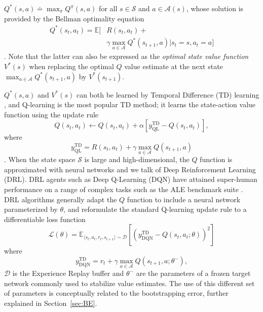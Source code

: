 $Q^*\left(s,a\right)\doteq\max_{\pi}Q^{\pi}\left(s,a\right)$ for all
$s\in\mathcal{S}$ and $a\in\mathcal{A}\left(s\right)$, whose solution
is provided by the Bellman optimality equation
\begin{equation}
\begin{aligned}
Q^*\left(s_t,a_t\right)=\mathbb{E}\bigg[&R\left(s_t,a_t\right)+\\ &\gamma
  \max_{a\in\mathcal{A}}Q^*\left(s_{t+1},a\right)\bigg\vert
  s_t=s,a_t=a \bigg]
\end{aligned}
\end{equation}
\citep{bellman1957dynamic}. Note that the latter can
also be expressed as the \textit{optimal state value function}
$V^*\left(s\right)$ when replacing the optimal $Q$ value estimate at
the next state
$\max_{a\in\mathcal{A}}Q^*\left(s_{t+1},a\right)$ by
$V^*\left(s_{t+1}\right)$.

$Q^*\left(s,a\right)$ and $V^*\left(s\right)$ can both be learned by
Temporal Difference (TD) learning
\citep{sutton1988learning}, and Q-learning is the most popular TD
method; it learns the state-action value function using the update
rule
\begin{equation}
Q\left(s_t,a_t\right)\leftarrow
Q\left(s_t,a_t\right)+\alpha\left[y^{\scriptscriptstyle
\textrm{TD}}_{\scriptscriptstyle \textrm{QL}}-Q\left(s_t,a_t\right)\right],
\end{equation}
where
\begin{equation}\label{eq:ql_td}
y^{\scriptscriptstyle \textrm{TD}}_{\scriptscriptstyle
\textrm{QL}}=R\left(s_t,a_t\right)+\gamma\max_{a\in\mathcal{A}}Q\left(s_{t+1},a\right)
\end{equation}
\citep{watkins1992q}. When the state space $\mathcal{S}$ is large and
high-dimensional, the $Q$ function is approximated with
neural networks and we talk of Deep Reinforcement Learning
(DRL). DRL agents such as Deep Q-Learning (DQN)
\citep{mnih2013playing} have attained super-human performance on a
range of complex tasks such as the ALE benchmark suite
\citep{bellemare2013arcade}. DRL algorithms generally adapt the $Q$
function to include a neural network parameterized by $\theta$, and
reformulate the standard Q-learning update rule to a differentiable
loss function
\begin{equation}
\mathcal{L}(\theta)=\mathbb{E}_{\langle s_t,a_t,r_t,s_{t+1}\rangle\sim
\mathcal{D}}\left[{\left(y^{\scriptscriptstyle \textrm{TD}}_{\scriptscriptstyle
\textrm{DQN}}-Q\left(s_t, a_t;\theta\right)\right)}^2\right]
\end{equation}
where
\begin{equation}\label{eq:dqn_td}
y^{\scriptscriptstyle \textrm{TD}}_{\scriptscriptstyle
\textrm{DQN}}=r_t+\gamma\max_{a\in\mathcal{A}}Q\left(s_{t+1},a;\theta^{-}\right),
\end{equation}
$\mathcal{D}$ is the Experience Replay buffer
\citep{lin1992self} and $\theta^-$ are the parameters of a frozen
target network commonly used to stabilize value estimates. The use of
this different set of parameters is conceptually related to the
bootstrapping error, further explained in Section~\ref{sec:BE}.

